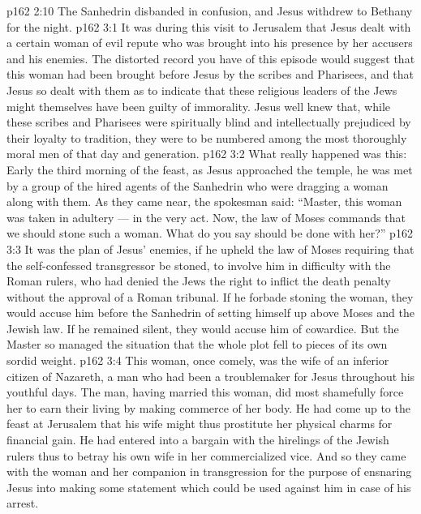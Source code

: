 \vs p162 2:10 The Sanhedrin disbanded in confusion, and Jesus withdrew to Bethany for the night.
\vs p162 3:1 It was during this visit to Jerusalem that Jesus dealt with a certain woman of evil repute who was brought into his presence by her accusers and his enemies. The distorted record you have of this episode would suggest that this woman had been brought before Jesus by the scribes and Pharisees, and that Jesus so dealt with them as to indicate that these religious leaders of the Jews might themselves have been guilty of immorality. Jesus well knew that, while these scribes and Pharisees were spiritually blind and intellectually prejudiced by their loyalty to tradition, they were to be numbered among the most thoroughly moral men of that day and generation.
\vs p162 3:2 What really happened was this: Early the third morning of the feast, as Jesus approached the temple, he was met by a group of the hired agents of the Sanhedrin who were dragging a woman along with them. As they came near, the spokesman said: “Master, this woman was taken in adultery --- in the very act. Now, the law of Moses commands that we should stone such a woman. What do you say should be done with her?”
\vs p162 3:3 It was the plan of Jesus’ enemies, if he upheld the law of Moses requiring that the self\hyp{}confessed transgressor be stoned, to involve him in difficulty with the Roman rulers, who had denied the Jews the right to inflict the death penalty without the approval of a Roman tribunal. If he forbade stoning the woman, they would accuse him before the Sanhedrin of setting himself up above Moses and the Jewish law. If he remained silent, they would accuse him of cowardice. But the Master so managed the situation that the whole plot fell to pieces of its own sordid weight.
\vs p162 3:4 This woman, once comely, was the wife of an inferior citizen of Nazareth, a man who had been a troublemaker for Jesus throughout his youthful days. The man, having married this woman, did most shamefully force her to earn their living by making commerce of her body. He had come up to the feast at Jerusalem that his wife might thus prostitute her physical charms for financial gain. He had entered into a bargain with the hirelings of the Jewish rulers thus to betray his own wife in her commercialized vice. And so they came with the woman and her companion in transgression for the purpose of ensnaring Jesus into making some statement which could be used against him in case of his arrest.
